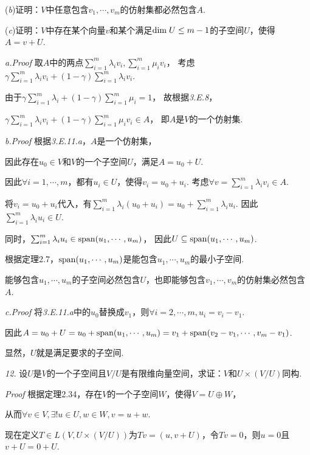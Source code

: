 (\textit{b})证明：\(V\)中任意包含\(v_1,\cdots,v_m\)的仿射集都必然包含\(A\).

(\textit{c})证明：\(V\)中存在某个向量\(v\)和某个满足\(\mathrm{dim \;} U \leq m-1\)的子空间\(U\)，使得\(A=v+U\).

\textit{a.Proof}
取\(A\)中的两点\(\sum_{i=1}^m \lambda_i v_i,\sum_{i=1}^m \mu_i v_i\)，
考虑\(\gamma \sum_{i=1}^m \lambda_i v_i+(1-\gamma)\sum_{i=1}^m \lambda_i v_i\).

由于\(\gamma \sum_{i=1}^m \lambda_i+(1-\gamma)\sum_{i=1}^m \mu_i=1\)，
故根据\textit{3.E.8}，

\(\gamma \sum_{i=1}^m \lambda_i v_i+(1-\gamma)\sum_{i=1}^m \mu_i v_i \in A\)，
即\(A\)是\(V\)的一个仿射集.

\textit{b.Proof}
根据\textit{3.E.11.a}，\(A\)是一个仿射集，

因此存在\(u_0 \in V\)和\(V\)的一个子空间\(U\)，满足\(A=u_0+U\).

因此\(\forall i=1,\cdots,m\)，都有\(u_i \in U\)，使得\(v_i=u_0+u_i\).
考虑\(\forall v=\sum_{i=1}^m \lambda_i v_i \in A\).

将\(v_i=u_0+u_i\)代入，有\(\sum_{i=1}^m \lambda_i(u_0+u_i)=u_0+\sum_{i=1}^m \lambda_i u_i\).
因此\(\sum_{i=1}^m \lambda_i u_i \in U\).

同时，\(\sum_{i=1}^m \lambda_i u_i \in \mathrm{span} (u_1,\cdots,u_m)\)，
因此\(U \subseteq \mathrm{span} (u_1,\cdots,u_m)\).

根据定理2.7，\(\mathrm{span} (u_1,\cdots,u_m)\)是能包含\(u_1,\cdots,u_m\)的最小子空间.

能够包含\(u_1,\cdots,u_m\)的子空间必然包含\(U\)，也即能够包含\(v_1,\cdots,v_m\)的仿射集必然包含\(A\).

\textit{c.Proof}
将\textit{3.E.11.a}中的\(u_0\)替换成\(v_1\)，则\(\forall i=2,\cdots,m,u_i=v_i-v_1\).

因此\(A=u_0+U=u_0+\mathrm{span} (u_1,\cdots,u_m)=v_1+\mathrm{span} (v_2-v_1,\cdots,v_m-v_1)\).

显然，\(U\)就是满足要求的子空间.

\hspace*{\fill}

\textit{12.}
设\(U\)是\(V\)的一个子空间且\(V/U\)是有限维向量空间，求证：\(V\)和\(U \times (V/U)\)同构.

\textit{Proof}
根据定理2.34，存在\(V\)的一个子空间\(W\)，使得\(V=U \oplus W\)，

从而\(\forall v \in V, \exists! u \in U,w \in W,v=u+w\).

现在定义\(T \in L(V,U \times (V/U))\)为\(Tv=(u,v+U)\)，令\(Tv=0\)，则\(u=0\)且\(v+U=0+U\).

